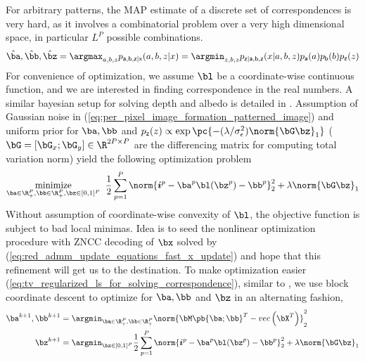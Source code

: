 \documentclass[../writeup.tex]{subfiles}
\begin{document}
For arbitrary patterns, the MAP estimate of a discrete set of correspondences is very hard, as it involves a combinatorial problem over a very high dimensional space, in particular $L^P$ possible combinations.
\begin{align}
    \hat{\ba},\hat{\bb},\hat{\bz}
        = \argmax_{a,b,z} p_{\ra,\rb,\rz|\rx}(a,b,z|x)
        = \argmin_{z,b,z} p_{\rz|\ra,\rb,\rz}(x|a,b,z) p_{\ra}(a) p_{\rb}(b) p_{\rz}(z)
    \label{eq:map_inference_of_correspondence_is_hard}
\end{align}
For convenience of optimization, we assume $\bl$ be a coordinate-wise continuous function, and we are interested in finding correspondence in the real numbers. A similar bayesian setup for solving depth and albedo is detailed in \cite{adamBayesianTimeofFlightRealtime2015}. Assumption of Gaussian noise in (\ref{eq:per_pixel_image_formation_patterned_image}) and uniform prior for $\ba,\bb$ and $p_{\rz}(z)\propto \exp\pc{ - (\lambda/\sigma_{\epsilon}^2) \norm{\bG \bz}_1 }$ ($\bG=[\bG_x;\bG_y]\in \R^{2P\times P}$ are the differencing matrix for computing total variation norm) yield the following optimization problem
\begin{align}
    \underset{ \ba\in\R_+^P,\bb\in\R_+^P,\bz\in [0,1]^P }{\text{minimize}}\;\;
        \frac{1}{2} \sum_{ p=1 }^P \norm{ \si^p - \ba^p \bl(\bz^p) - \bb^p }_2^2 + \lambda \norm{\bG \bz}_1
    \label{eq:tv_regularized_ls_for_solving_correspondence}
\end{align}
Without assumption of coordinate-wise convexity of $\bl$, the objective function is subject to bad local minimas. Idea is to seed the nonlinear optimization procedure with ZNCC decoding of $\bx$ solved by (\ref{eq:red_admm_update_equations_fast_x_update}) and hope that this refinement will get us to the destination. To make optimization easier (\ref{eq:tv_regularized_ls_for_solving_correspondence}), similar to \cite{rosmanSparseModelingShape2012}, we use block coordinate descent to optimize for $\ba,\bb$ and $\bz$ in an alternating fashion,
\begin{align}
    \ba^{k+1},\bb^{k+1}
        &= \argmin_{\ba\in\R_+^P,\bb\in\R_+^P} \norm{ \bM\pb{\ba;\bb}^T - \vec{\bX^T} }_2^2 
    \label{eq:tv_regularized_ls_for_solving_correspondence_altmin_1} \\
    \bz^{k+1}
        &= \argmin_{\bz\in[0,1]^P} \frac{1}{2} \sum_{ p=1 }^P \norm{ \si^p - \ba^p \bl(\bz^p) - \bb^p }_2^2 + \lambda \norm{\bG \bz}_1 
    \label{eq:tv_regularized_ls_for_solving_correspondence_altmin_2}
\end{align}
\end{document}
